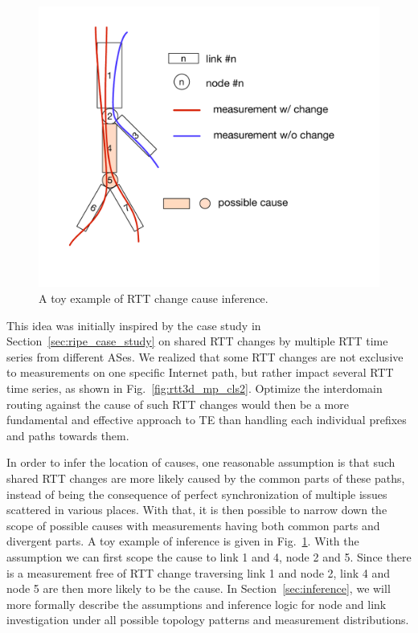 \begin{figure}[!htb]
\centering
\includegraphics[width=.75\textwidth]{gfx/chap5/toy_inference.pdf}
\caption{A toy example of RTT change cause inference.}
\label{fig:chap5_toy_inference}
\end{figure}

This idea was initially inspired by the case study in Section~\ref{sec:ripe_case_study} on shared RTT changes by multiple RTT time series from different ASes. 
We realized that some RTT changes are not exclusive to measurements on one specific Internet path, but rather impact several RTT time series, as shown in Fig.~\ref{fig:rtt3d_mp_cls2}.
Optimize the interdomain routing against the cause of such RTT changes would then be a more fundamental and effective approach to TE than handling each individual prefixes and paths towards them.

In order to infer the location of causes, one reasonable assumption is that such shared RTT changes are more likely caused by the common parts of these paths, instead of being the consequence of perfect synchronization of multiple issues scattered in various places.
With that, it is then possible to narrow down the scope of possible causes with measurements having both common parts and divergent parts. A toy example of inference is given in Fig.~\ref{fig:chap5_toy_inference}. With the assumption we can first scope the cause to link 1 and 4, node 2 and 5. Since there is a measurement free of RTT change traversing link 1 and node 2, link 4 and node 5 are then more likely to be the cause. In Section~\ref{sec:inference}, we will more formally describe the assumptions and inference logic for node and link investigation under all possible topology patterns and measurement distributions.

